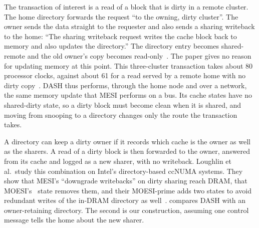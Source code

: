 The transaction of interest is a read of a block that is dirty in a remote cluster.
The home directory forwards the request ``to the owning, dirty cluster''. The owner
sends the data straight to the requester and also sends a sharing writeback to the
home: ``The sharing writeback request writes the cache block back to memory and
also updates the directory.'' The directory entry becomes shared-remote and the old
owner's copy becomes read-only~\cite[\S4.1]{lenoski1990dash}. The paper gives no
reason for updating memory at this point. This three-cluster transaction takes
about 80 processor clocks, against about 61 for a read served by a remote home with
no dirty copy~\cite[\S4.2, Fig.~6]{lenoski1990dash}. DASH thus performs, through
the home node and over a network, the same memory update that MESI performs on a
bus. Its cache states have no shared-dirty state, so a dirty block must become
clean when it is shared, and moving from snooping to a directory changes only the
route the transaction takes.

A directory can keep a dirty owner if it records which cache is the owner as well
as the sharers. A read of a dirty block is then forwarded to the owner, answered
from its cache and logged as a new sharer, with no writeback. Loughlin et al.\
study this combination on Intel's directory-based ccNUMA systems. They show that
MESI's ``downgrade writebacks'' on dirty sharing reach DRAM, that MOESI's \stO\
state removes them, and their MOESI-prime adds two states to avoid redundant
writes of the in-DRAM directory as well~\cite{loughlin2022moesiprime}.
\Cref{fig:dir-dirty-read} compares DASH with an owner-retaining directory. The
second is our construction, assuming one control message tells the home about the
new sharer.

